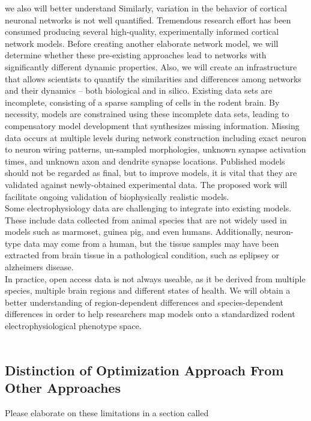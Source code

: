 we also will better understand Similarly, variation in the behavior of cortical neuronal networks is not well quantified. Tremendous research effort has been consumed producing several high-quality, experimentally informed cortical network models. Before creating another elaborate network model, we will determine whether these pre-existing approaches lead to networks with significantly different dynamic properties. Also, we will create an infrastructure that allows scientists to quantify the similarities and differences among networks and their dynamics – both biological and in silico.\newline
\newline
Existing data sets are incomplete, consisting of a sparse sampling of cells in the rodent brain. By necessity, models are constrained using these incomplete data sets, leading to compensatory model development that synthesizes missing information. Missing data occurs at multiple levels during network construction including exact neuron to neuron wiring patterns, un-sampled morphologies, unknown synapse activation times, and unknown axon and dendrite synapse locations. Published models should not be regarded as final, but to improve models, it is vital that they are validated against newly-obtained experimental data. The proposed work will facilitate ongoing validation of biophysically realistic models. 
\\
Some electrophysiology data are challenging to integrate into existing models.
These include data collected from animal species that are not widely used in models such as marmoset, guinea pig, and even humans. 
Additionally, neuron-type data may come from a human, but the tissue samples may have been extracted from brain tissue in a pathological condition, such as eplipsey or alzheimers disease.
\\
In practice, open access data is not always useable, as it be derived from multiple species, multiple brain regions and different states of health. We will obtain a better understanding of region-dependent differences and species-dependent differences in order to help researchers map models onto a standardized rodent electrophysiological phenotype space.\\
\\
\subsection{Distinction of Optimization Approach From Other Approaches}
Please elaborate on these limitations in a section called 



